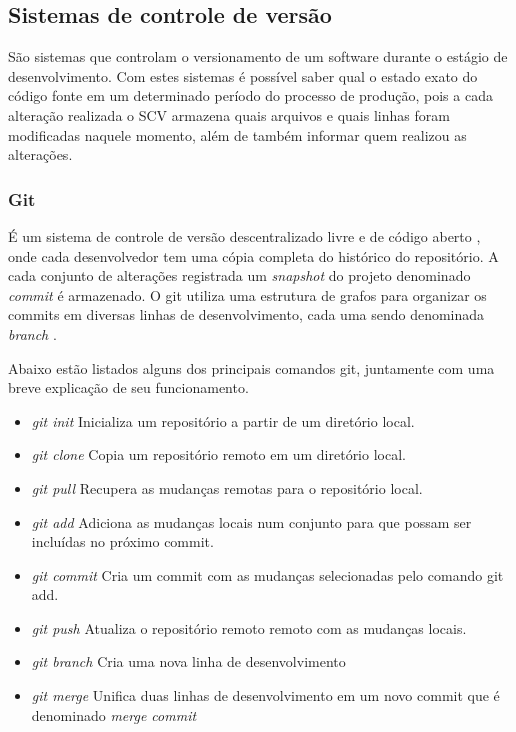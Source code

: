 \documentclass[a4paper,12pt]{article}
\begin{document}
\subsection{Sistemas de controle de versão}%
\label{sec:scv}
São sistemas que controlam o versionamento de um software durante o estágio de desenvolvimento. Com estes sistemas é possível saber qual o estado exato do código fonte em um determinado período do processo de produção, pois a cada alteração realizada o SCV armazena quais arquivos e quais linhas foram modificadas naquele momento, além de também informar quem realizou as alterações.

\subsubsection{Git}%
É um sistema de controle de versão descentralizado livre e de código aberto \cite{git}, onde cada desenvolvedor tem uma cópia completa do histórico do repositório. A cada conjunto de  alterações registrada  um \textit{snapshot} do projeto denominado \textit{commit} é armazenado. O git utiliza uma estrutura de grafos para organizar os commits em diversas linhas de desenvolvimento, cada uma sendo denominada \textit{branch} \cite{gitHandbook}.

Abaixo estão listados alguns dos principais comandos git, juntamente com uma breve explicação de seu funcionamento.

\begin{itemize}
\item{\textit{git init} } Inicializa um repositório a partir de um diretório local.
\item{\textit{git clone} } Copia um repositório remoto em um diretório local.
\item{\textit{git pull} } Recupera as mudanças remotas para o repositório local.
\item{\textit{git add} } Adiciona as mudanças locais num conjunto para que possam ser incluídas no próximo commit.
\item{\textit{git commit} } Cria um commit com as mudanças selecionadas pelo comando git add.
\item{\textit{git push} } Atualiza o repositório remoto remoto com as mudanças locais.
\item{\textit{git branch} } Cria uma nova linha de desenvolvimento
\item{\textit{git merge} } Unifica duas linhas de desenvolvimento em um novo commit que é denominado \textit{merge commit}
\end{itemize}
\end{document}
